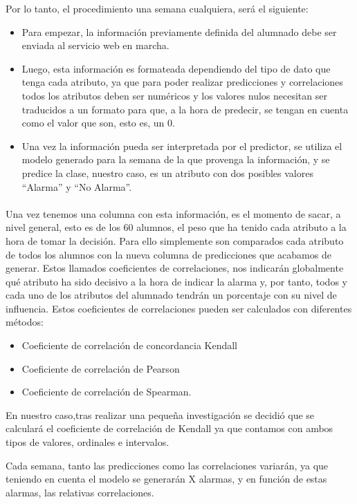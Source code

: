 Por lo tanto, el procedimiento una semana cualquiera, será el siguiente:
\begin{itemize}
\item{Para empezar, la información previamente definida del alumnado debe ser enviada al servicio web en marcha.}
\item{Luego, esta información es formateada dependiendo del tipo de dato que tenga cada atributo, ya que para poder realizar predicciones y correlaciones todos los atributos deben ser numéricos y los valores nulos necesitan ser traducidos a un formato para que, a la hora de predecir, se tengan en cuenta como el valor que son, esto es, un 0.}
\item{Una vez la información pueda ser interpretada por el predictor, se utiliza el modelo generado para la semana de la que provenga la información, y se predice la clase, nuestro caso, es un atributo con dos posibles valores “Alarma” y “No Alarma”.}
\end{itemize}

\paragraph{}
Una vez tenemos una columna con esta información, es el momento de sacar, a nivel general, esto es de los 60 alumnos, el peso que ha tenido cada atributo a la hora de tomar la decisión. Para ello simplemente son comparados cada atributo de todos los alumnos con la nueva columna de predicciones que acabamos de generar. Estos llamados coeficientes de correlaciones, nos indicarán globalmente qué atributo ha sido decisivo a la hora de indicar la alarma y, por tanto, todos y cada uno de los atributos del alumnado tendrán un porcentaje con su nivel de influencia. Estos coeficientes de correlaciones pueden ser calculados con diferentes métodos:
\begin{itemize}
\item{Coeficiente de correlación de concordancia Kendall}
\item{Coeficiente de correlación de Pearson}
\item{Coeficiente de correlación de Spearman.}
\end{itemize}

En nuestro caso,tras realizar una pequeña investigación se decidió que se calculará el coeficiente de correlación de Kendall \cite{coeficienteDeCorrelacionKendall} ya que contamos con ambos tipos de valores, ordinales e intervalos.

Cada semana, tanto las predicciones como las correlaciones variarán, ya que teniendo en cuenta el modelo se generarán X alarmas, y en función de estas alarmas, las relativas correlaciones.


